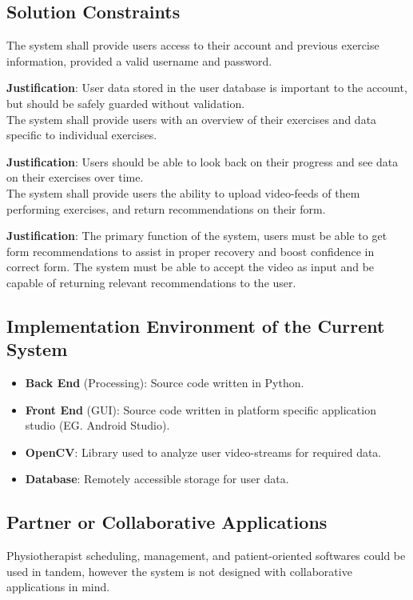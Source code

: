 \documentclass[12pt]{article}
\begin{document}
\subsection{Solution Constraints}
The system shall provide users access to their account and previous exercise information, provided a valid username and password.

\textbf{Justification}: User data stored in the user database is important to the account, but should be safely guarded without validation.\\

The system shall provide users with an overview of their exercises and data specific to individual exercises.

\textbf{Justification}: Users should be able to look back on their progress and see data on their exercises over time.\\

The system shall provide users the ability to upload video-feeds of them performing exercises, and return recommendations on their form.

\textbf{Justification}: The primary function of the system, users must be able to get form recommendations to assist in proper recovery and boost confidence in correct form. The system must be able to accept the video as input and be capable of returning relevant recommendations to the user.

\subsection{Implementation Environment of the Current System}
\begin{itemize}
  \item \textbf{Back End} (Processing): Source code written in Python.
  \item \textbf{Front End} (GUI): Source code written in platform specific application studio (EG. Android Studio).
  \item \textbf{OpenCV}: Library used to analyze user video-streams for required data.
  \item \textbf{Database}: Remotely accessible storage for user data.
\end{itemize}

\subsection{Partner or Collaborative Applications}
Physiotherapist scheduling, management, and patient-oriented softwares could be used in tandem, however the system is not designed with collaborative applications in mind.
\end{document}
